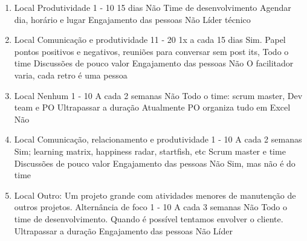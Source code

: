 \begin{enumerate}[leftmargin=0em]
	\item
	\begin{respostas2}
		{Local}
		{Produtividade}
		{1 - 10}
		{15 dias}
		{Não}
		{Time de desenvolvimento}
		{Agendar dia, horário e lugar \newline Engajamento das pessoas}
		{Não}
		{Líder técnico}
	\end{respostas2}

	\item
	\begin{respostas2}
		{Local}
		{Comunicação e produtividade}
		{11 - 20}
		{1x a cada 15 dias}
		{Sim. Papel pontos positivos e negativos, reuniões para conversar sem post its,}
		{Todo o time}
		{Discussões de pouco valor \newline Engajamento das pessoas}
		{Não}
		{O facilitador varia, cada retro é uma pessoa}
	\end{respostas2}

	\item
	\begin{respostas2}
		{Local}
		{Nenhum}
		{1 - 10}
		{A cada 2 semanas}
		{Não}
		{Todo o time: scrum master, Dev team e PO}
		{Ultrapassar a duração}
		{Atualmente PO organiza tudo em Excel}
		{Não}
	\end{respostas2}

	\item
	\begin{respostas2}
		{Local}
		{Comunicação, relacionamento e produtividade}
		{1 - 10}
		{A cada 2 semanas}
		{Sim; learning matrix, happiness radar, startfish, etc}
		{Scrum master e time}
		{Discussões de pouco valor \newline Engajamento das pessoas}
		{Não}
		{Sim, mas não é do time}
	\end{respostas2}

	\item
	\begin{respostas2}
		{Local}
		{Outro: Um projeto grande com atividades menores de manutenção de outros projetos. Alternância de foco}
		{1 - 10}
		{A cada 3 semanas}
		{Não}
		{Todo o time de desenvolvimento. Quando é possível tentamos envolver o cliente.}
		{Ultrapassar a duração \newline Engajamento das pessoas}
		{Não}
		{Líder}
	\end{respostas2}


\end{enumerate}
